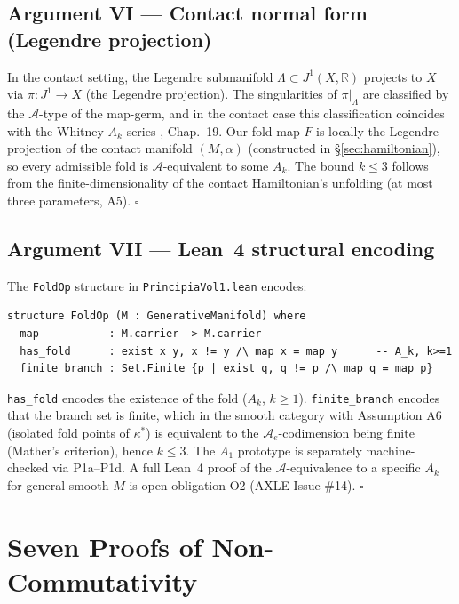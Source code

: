 \documentclass[14pt,a4paper]{extarticle}
\begin{document}
\subsection*{Argument VI\; — Contact normal form (Legendre projection)}

In the contact setting, the Legendre submanifold $\Lambda \subset J^1(X,\mathbb{R})$
projects to $X$ via $\pi: J^1 \to X$ (the Legendre projection).
The singularities of $\pi|_\Lambda$ are classified by the
$\mathcal{A}$-type of the map-germ, and in the contact case this
classification coincides with the Whitney $A_k$ series
\cite{Arnold1986}, Chap.~19.
Our fold map $F$ is locally the Legendre projection of the contact
manifold $(M, \alpha)$ (constructed in \S\ref{sec:hamiltonian}),
so every admissible fold is $\mathcal{A}$-equivalent to some $A_k$.
The bound $k \le 3$ follows from the finite-dimensionality of the
contact Hamiltonian's unfolding (at most three parameters, A5).  \hfill $\square$

\subsection*{Argument VII\; — Lean~4 structural encoding}

The \texttt{FoldOp} structure in \texttt{PrincipiaVol1.lean} encodes:
\begin{verbatim}
structure FoldOp (M : GenerativeManifold) where
  map           : M.carrier -> M.carrier
  has_fold      : exist x y, x != y /\ map x = map y      -- A_k, k>=1
  finite_branch : Set.Finite {p | exist q, q != p /\ map q = map p}
\end{verbatim}
\texttt{has\_fold} encodes the existence of the fold ($A_k$, $k \ge 1$).
\texttt{finite\_branch} encodes that the branch set is finite, which
in the smooth category with Assumption A6 (isolated fold points of $\kappa^*$)
is equivalent to the $\mathcal{A}_e$-codimension being finite
(Mather's criterion), hence $k \le 3$.
The $A_1$ prototype is separately machine-checked via P1a--P1d.
A full Lean~4 proof of the $\mathcal{A}$-equivalence to a specific $A_k$
for general smooth $M$ is open obligation O2 (AXLE Issue \#14).  \hfill $\square$

\section{Seven Proofs of Non-Commutativity}
\label{sec:noncommutativity-seven}
\end{document}

